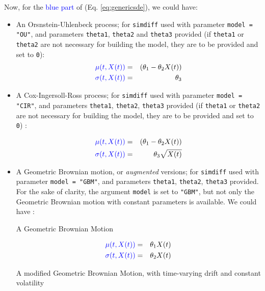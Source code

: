 \documentclass[a4paper]{article}\usepackage[]{graphicx}\usepackage[]{color}
\newcommand{\code}[1]{\mbox{\texttt{#1}}}
\begin{document}
Now, for the \textcolor{blue}{blue part} of (Eq. \ref{eq:genericsde}), we could have: 

\begin{itemize}

\item An Orsnstein-Uhlenbeck process; for \code{simdiff} used with parameter \newline \code{model = "OU"}, and parameters \code{theta1}, \code{theta2} and \code{theta3} provided (if \code{theta1} or \code{theta2} are  not necessary for building the model, they are to be provided and set to \code{0}):
\begin{eqnarray*}
\textcolor{blue}{\mu(t, X(t))} &=& (\theta_1 - \theta_2 X(t))\\
\textcolor{blue}{\sigma(t, X(t))} &=& \theta_3\\
\end{eqnarray*}

\item A Cox-Ingersoll-Ross process; for \code{simdiff} used with parameter \newline \code{model = "CIR"}, and parameters \code{theta1}, \code{theta2}, \code{theta3} provided (if \code{theta1} or \code{theta2} are  not necessary for building the model, they are to be provided and set to \code{0}) : 

\begin{eqnarray*}
\textcolor{blue}{\mu(t, X(t))} &=& (\theta_1 - \theta_2 X(t))\\
\textcolor{blue}{\sigma(t, X(t))} &=& \theta_3 \sqrt{X(t)}\\
\end{eqnarray*} 

\item A Geometric Brownian motion, or \textit{augmented} versions; for \code{simdiff} used with parameter \code{model = "GBM"}, and parameters \code{theta1}, \code{theta2}, \code{theta3} provided. For the sake of clarity, the argument \code{model} is set to \code{"GBM"}, but not only the Geometric Brownian motion with constant parameters is available. We could have : 

A Geometric Brownian Motion

\begin{eqnarray*}
\textcolor{blue}{\mu(t, X(t))} &=& \theta_1 X(t)\\
\textcolor{blue}{\sigma(t, X(t))} &=& \theta_2 X(t)\\ 
\end{eqnarray*}

A modified Geometric Brownian Motion, with time-varying drift and constant volatility


\end{itemize}
\end{document}
